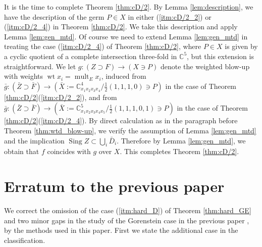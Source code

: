 \documentclass[a4paper,11pt]{amsart}
\theoremstyle{definition}
\theoremstyle{remark}
\numberwithin{equation}{section}
\newcommand{\bC}{{\mathbb C}}
\newcommand{\mult}{\operatorname{mult}}
\newcommand{\Sing}{\operatorname{Sing}}
\newcommand{\wt}{\operatorname{wt}}
\begin{document}
It is the time to complete Theorem \ref{thm:cD/2}.
By Lemma \ref{lem:description},
we have the description of the germ $P \in X$ in
either (\ref{itm:cD/2_2}) or (\ref{itm:cD/2_4}) in Theorem \ref{thm:cD/2}.
We take this description and apply Lemma \ref{lem:gen_mtd}.
Of course we need to extend Lemma \ref{lem:gen_mtd}
in treating the case (\ref{itm:cD/2_4}) of Theorem \ref{thm:cD/2},
where $P \in X$ is given by a cyclic quotient
of a complete intersection three-fold in $\bC^5$,
but this extension is straightforward.
We let $g \colon (Z \supset F) \to (X \ni P)$ denote the weighted blow-up
with weights $\wt x_i=\mult_E x_i$,
induced from $\bar{g} \colon (\bar{Z} \supset \bar{F}) \to
(\bar{X}:=\bC_{x_1x_2x_3x_4}^4/\frac{1}{2}(1,1,1,0) \ni P)$
in the case of Theorem \ref{thm:cD/2}(\ref{itm:cD/2_2}),
and from $\bar{g} \colon (\bar{Z} \supset \bar{F}) \to
(\bar{X}:=\bC_{x_1x_2x_3x_4x_5}^5/\frac{1}{2}(1,1,1,0,1) \ni P)$
in the case of Theorem \ref{thm:cD/2}(\ref{itm:cD/2_4}).
By direct calculation as in the paragraph before Theorem \ref{thm:wtd_blow-up},
we verify the assumption of Lemma \ref{lem:gen_mtd} and
the implication $\Sing Z \subset \bigcup_i \bar{D}_i$.
Therefore by Lemma \ref{lem:gen_mtd},
we obtain that $f$ coincides with $g$ over $X$.
This completes Theorem \ref{thm:cD/2}.

\section*{Erratum to the previous paper}
We correct the omission of
the case (\ref{itm:hard_D}) of Theorem \ref{thm:hard_GE} and two minor gaps
in the study of the Gorenstein case in the previous paper \cite{Ka03},
by the methods used in this paper.
First we state the additional case in the classification.
\end{document}

